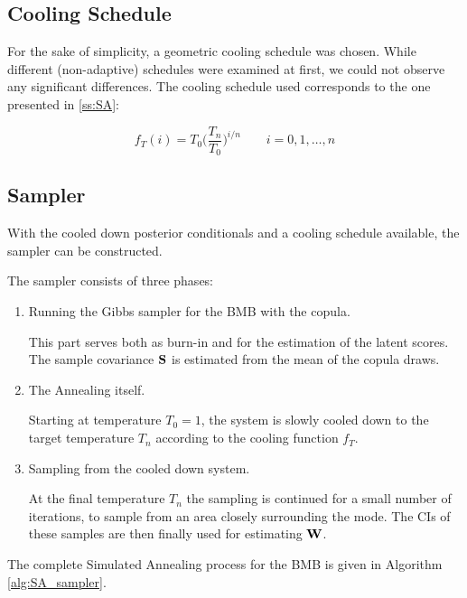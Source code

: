 \subsection{Cooling Schedule}
For the sake of simplicity, a geometric cooling schedule was chosen.
While different (non-adaptive) schedules were examined at first, we could not observe any significant differences.
The cooling schedule used corresponds to the one presented in \autoref{ss:SA}:

\begin{tcolorbox}[title=Geometric Cooling Schedule (2)]
	\begin{equation}
	f_T(i) = T_0  \Big(\frac{T_n}{T_0}\Big)^{i/n} \quad \quad i = 0,1,\dots,n
	\end{equation}
\end{tcolorbox}

\subsection{Sampler}
With the cooled down posterior conditionals and a cooling schedule available, the sampler can be constructed.

The sampler consists of three phases:

\begin{enumerate}
	\item 
	Running the Gibbs sampler for the \gls{BMB} with the copula.
	
	This part serves both as burn-in and for the estimation of the latent scores.
	The sample covariance $\mathbf{S}$ is estimated from the mean of the copula draws.
	\item 
	The Annealing itself.
	
	Starting at temperature $T_0=1$, the system is slowly cooled down to the target temperature $T_n$ according to the cooling function $f_T$.
	\item
	Sampling from the cooled down system.
	
	At the final temperature $T_n$ the sampling is continued for a small number of iterations, to sample from an area closely surrounding the mode. The \gls{CI}s of these samples are then finally used for estimating $\mathbf{W}$.
\end{enumerate}
The complete Simulated Annealing process for the \gls{BMB} is given in Algorithm \autoref{alg:SA_sampler}.


